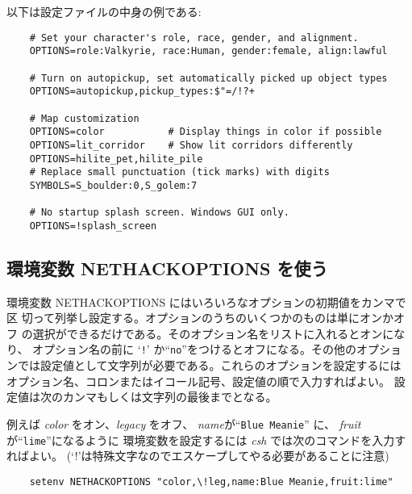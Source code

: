 以下は設定ファイルの中身の例である:
\begin{verbatim}
    # Set your character's role, race, gender, and alignment.
    OPTIONS=role:Valkyrie, race:Human, gender:female, align:lawful

    # Turn on autopickup, set automatically picked up object types
    OPTIONS=autopickup,pickup_types:$"=/!?+

    # Map customization
    OPTIONS=color           # Display things in color if possible
    OPTIONS=lit_corridor    # Show lit corridors differently
    OPTIONS=hilite_pet,hilite_pile
    # Replace small punctuation (tick marks) with digits
    SYMBOLS=S_boulder:0,S_golem:7

    # No startup splash screen. Windows GUI only.
    OPTIONS=!splash_screen
\end{verbatim}

\subsection*{環境変数 NETHACKOPTIONS を使う}

環境変数 NETHACKOPTIONS にはいろいろなオプションの初期値をカンマで区
切って列挙し設定する。オプションのうちのいくつかのものは単にオンかオフ
の選択ができるだけである。そのオプション名をリストに入れるとオンになり、
オプション名の前に `{\tt !}' か``{\tt no}''をつけるとオフになる。その他のオプショ
ンでは設定値として文字列が必要である。これらのオプションを設定するには
オプション名、コロンまたはイコール記号、設定値の順で入力すればよい。
設定値は次のカンマもしくは文字列の最後までとなる。

例えば {\it color\/} をオン、{\it legacy\/} をオフ、
{\it name\/}が``{\tt Blue Meanie}'' に、
{\it fruit\/}が``{\tt lime}''になるように
環境変数を設定するには {\it csh} では次のコマンドを入力すればよい。
(`!'は特殊文字なのでエスケープしてやる必要があることに注意)
\begin{verbatim}
    setenv NETHACKOPTIONS "color,\!leg,name:Blue Meanie,fruit:lime"
\end{verbatim}

